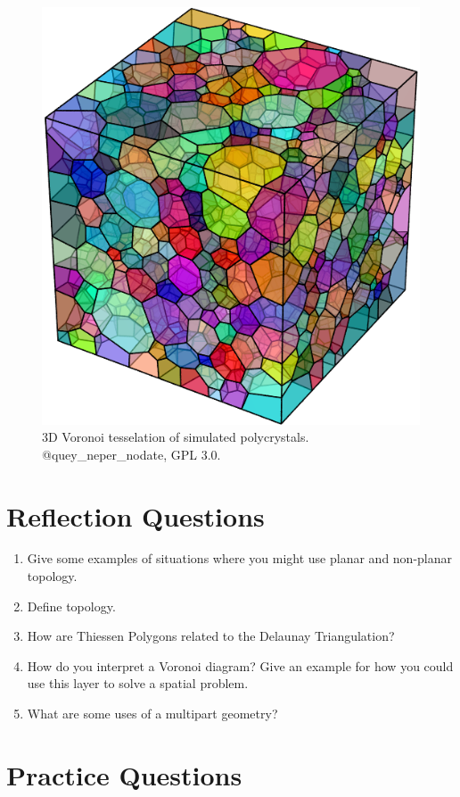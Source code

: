 \documentclass[
]{book}
\providecommand{\tightlist}{%
  \setlength{\itemsep}{0pt}\setlength{\parskip}{0pt}}
\begin{document}
\begin{figure}
\includegraphics[width=0.75\linewidth]{images/07-neper} \caption{3D Voronoi tesselation of simulated polycrystals. @quey_neper_nodate, GPL 3.0.}\label{fig:7-neper}
\end{figure}

\section*{Reflection Questions}\label{reflection-questions-4}

\begin{enumerate}
\def\labelenumi{\arabic{enumi}.}
\tightlist
\item
  Give some examples of situations where you might use planar and non-planar topology.
\item
  Define topology.
\item
  How are Thiessen Polygons related to the Delaunay Triangulation?
\item
  How do you interpret a Voronoi diagram? Give an example for how you could use this layer to solve a spatial problem.
\item
  What are some uses of a multipart geometry?
\end{enumerate}

\section*{Practice Questions}\label{practice-questions-2}
\end{document}
